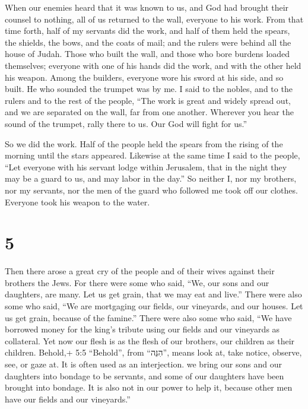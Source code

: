  When our enemies heard that it was known to us, and God
had brought their counsel to nothing, all of us returned to the wall,
everyone to his work.  From that time forth, half of my
servants did the work, and half of them held the spears, the shields,
the bows, and the coats of mail; and the rulers were behind all the
house of Judah.  Those who built the wall, and those who
bore burdens loaded themselves; everyone with one of his hands did the
work, and with the other held his weapon.  Among the
builders, everyone wore his sword at his side, and so built. He who
sounded the trumpet was by me.  I said to the nobles, and
to the rulers and to the rest of the people, ``The work is great and
widely spread out, and we are separated on the wall, far from one
another.  Wherever you hear the sound of the trumpet, rally
there to us. Our God will fight for us.''

 So we did the work. Half of the people held the spears
from the rising of the morning until the stars appeared. 
Likewise at the same time I said to the people, ``Let everyone with his
servant lodge within Jerusalem, that in the night they may be a guard to
us, and may labor in the day.''  So neither I, nor my
brothers, nor my servants, nor the men of the guard who followed me took
off our clothes. Everyone took his weapon to the water.

\hypertarget{section-4}{%
\section{5}\label{section-4}}

 Then there arose a great cry of the people and of their
wives against their brothers the Jews.  For there were some
who said, ``We, our sons and our daughters, are many. Let us get grain,
that we may eat and live.''  There were also some who said,
``We are mortgaging our fields, our vineyards, and our houses. Let us
get grain, because of the famine.''  There were also some
who said, ``We have borrowed money for the king's tribute using our
fields and our vineyards as collateral.  Yet now our flesh
is as the flesh of our brothers, our children as their children.
Behold,+ 5:5 ``Behold'', from ``הִנֵּה'', means look at, take notice,
observe, see, or gaze at. It is often used as an interjection. we bring
our sons and our daughters into bondage to be servants, and some of our
daughters have been brought into bondage. It is also not in our power to
help it, because other men have our fields and our vineyards.''

